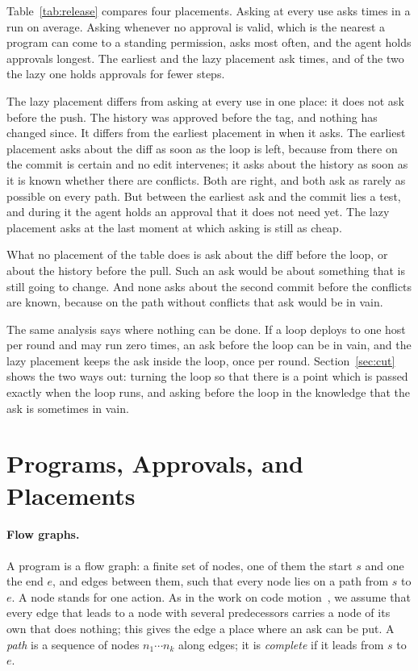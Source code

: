 \documentclass[acmsmall,nonacm,screen]{acmart}
\newcommand{\claim}[2]{#2}
\begin{document}
\claim{example}{Table~\ref{tab:release} compares four placements. Asking at every use asks
\exReleaseNaive{} times in a run on average. Asking whenever no approval is valid, which is
the nearest a program can come to a standing permission, asks most often, and the agent
holds approvals longest. The earliest and the lazy placement ask \exReleaseLazy{} times, and
of the two the lazy one holds approvals for fewer steps.}

The lazy placement differs from asking at every use in one place: it does not ask before
the push. The history was approved before the tag, and nothing has changed since. It
differs from the earliest placement in when it asks. The earliest placement asks about the
diff as soon as the loop is left, because from there on the commit is certain and no edit
intervenes; it asks about the history as soon as it is known whether there are conflicts.
Both are right, and both ask as rarely as possible on every path. But between the earliest
ask and the commit lies a test, and during it the agent holds an approval that it does not
need yet. The lazy placement asks at the last moment at which asking is still as cheap.

What no placement of the table does is ask about the diff before the loop, or about the
history before the pull. Such an ask would be about something that is still going to
change. And none asks about the second commit before the conflicts are known, because on
the path without conflicts that ask would be in vain.

The same analysis says where nothing can be done. If a loop deploys to one host per round
and may run zero times, an ask before the loop can be in vain, and the lazy placement keeps
the ask inside the loop, once per round. Section~\ref{sec:cut} shows the two ways out:
turning the loop so that there is a point which is passed exactly when the loop runs, and
asking before the loop in the knowledge that the ask is sometimes in vain.

\section{Programs, Approvals, and Placements}
\label{sec:model}

\paragraph{Flow graphs.} A program is a flow graph: a finite set of nodes, one of them the
start $s$ and one the end $e$, and edges between them, such that every node lies on a path
from $s$ to $e$. A node stands for one action. As in the work on code
motion~\cite{knoop1994}, we assume that every edge that leads to a node with several
predecessors carries a node of its own that does nothing; this gives the edge a place where
an ask can be put. A \emph{path} is a sequence of nodes $n_1 \cdots n_k$ along edges; it is
\emph{complete} if it leads from $s$ to $e$.
\end{document}

